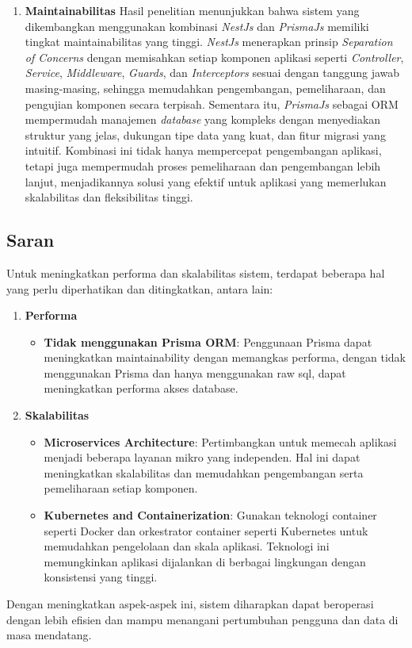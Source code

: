 \begin{enumerate}
  \item \textbf{Maintainabilitas}\newline
  Hasil penelitian menunjukkan bahwa sistem yang dikembangkan menggunakan kombinasi \textit{NestJs} dan \textit{PrismaJs} memiliki tingkat maintainabilitas yang tinggi. \textit{NestJs} menerapkan prinsip \textit{Separation of Concerns} dengan memisahkan setiap komponen aplikasi seperti \textit{Controller}, \textit{Service}, \textit{Middleware}, \textit{Guards}, dan \textit{Interceptors} sesuai dengan tanggung jawab masing-masing, sehingga memudahkan pengembangan, pemeliharaan, dan pengujian komponen secara terpisah. Sementara itu, \textit{PrismaJs} sebagai ORM mempermudah manajemen \textit{database} yang kompleks dengan menyediakan struktur yang jelas, dukungan tipe data yang kuat, dan fitur migrasi yang intuitif. Kombinasi ini tidak hanya mempercepat pengembangan aplikasi, tetapi juga mempermudah proses pemeliharaan dan pengembangan lebih lanjut, menjadikannya solusi yang efektif untuk aplikasi yang memerlukan skalabilitas dan fleksibilitas tinggi.

\end{enumerate}

\subsection{Saran}
Untuk meningkatkan performa dan skalabilitas sistem, terdapat beberapa hal yang perlu diperhatikan dan ditingkatkan, antara lain:
\begin{enumerate}
  \item \textbf{Performa} \newline
  \begin{itemize}
    \item \textbf{Tidak menggunakan Prisma ORM}: Penggunaan Prisma dapat meningkatkan maintainability dengan memangkas performa, dengan tidak menggunakan Prisma dan hanya menggunakan raw sql, dapat meningkatkan performa akses database.
  \end{itemize}
  \item \textbf{Skalabilitas} \newline
  \begin{itemize}
    \item \textbf{Microservices Architecture}: Pertimbangkan untuk memecah aplikasi menjadi beberapa layanan mikro yang independen. Hal ini dapat meningkatkan skalabilitas dan memudahkan pengembangan serta pemeliharaan setiap komponen.
    \item \textbf{Kubernetes and Containerization}: Gunakan teknologi container seperti Docker dan orkestrator container seperti Kubernetes untuk memudahkan pengelolaan dan skala aplikasi. Teknologi ini memungkinkan aplikasi dijalankan di berbagai lingkungan dengan konsistensi yang tinggi.
  \end{itemize}
\end{enumerate}
Dengan meningkatkan aspek-aspek ini, sistem diharapkan dapat beroperasi dengan lebih efisien dan mampu menangani pertumbuhan pengguna dan data di masa mendatang.

